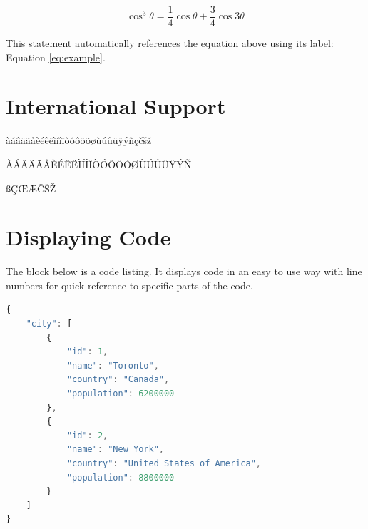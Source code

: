 \documentclass[
	a4paper, %
	11pt, %
]{DC_Report}
\begin{document}
\begin{equation}
	\cos^3 \theta =\frac{1}{4}\cos\theta+\frac{3}{4}\cos 3\theta
	\label{eq:example}
\end{equation}

This statement automatically references the equation above using its label: Equation \ref{eq:example}.


\section{International Support}

àáâäãåèéêëìíîïòóôöõøùúûüÿýñçčšž

ÀÁÂÄÃÅÈÉÊËÌÍÎÏÒÓÔÖÕØÙÚÛÜŸÝÑ

ßÇŒÆČŠŽ


\section{Displaying Code}

The block below is a code listing. It displays code in an easy to use way with line numbers for quick reference to specific parts of the code.

\begin{lstlisting}[language=JavaScript,style=gruvbox-light]
{
	"city": [
		{
			"id": 1,
			"name": "Toronto",
			"country": "Canada",
			"population": 6200000
		},
		{
			"id": 2,
			"name": "New York",
			"country": "United States of America",
			"population": 8800000
		}
	]
}
\end{lstlisting}


\newpage

\end{document}
